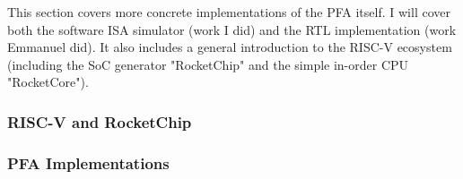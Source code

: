 This section covers more concrete implementations of the PFA itself. I will cover both the software ISA simulator (work I did) and the RTL implementation (work Emmanuel did). It also includes a general introduction to the RISC-V ecosystem (including the SoC generator "RocketChip" and the simple in-order CPU "RocketCore").

\subsubsection{RISC-V and RocketChip}

\subsubsection{PFA Implementations}
